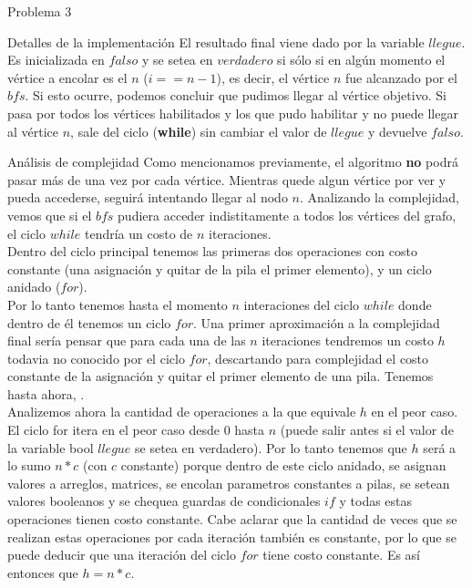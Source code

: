 \begin{section}{Problema 3}
\begin{subsection}{Detalles de la implementación}
		El resultado final viene dado por la variable $llegue$. Es inicializada en $falso$ y se setea en $verdadero$ si sólo si en algún momento el vértice a encolar es el $n$ ($i == n-1$), es decir, el vértice $n$ fue alcanzado por el $bfs$. Si esto ocurre, podemos concluir que pudimos llegar al vértice objetivo. Si pasa por todos los vértices habilitados y los que pudo habilitar y no puede llegar al vértice $n$, sale del ciclo (\textbf{while}) sin cambiar el valor de $llegue$ y devuelve $falso$.\\
		
	\end{subsection}


	\begin{subsection}{Análisis de complejidad}
		Como mencionamos previamente, el algoritmo \textbf{no} podrá pasar más de una vez por cada vértice. Mientras quede algun vértice por ver y pueda accederse, seguirá intentando llegar al nodo $n$. Analizando la complejidad, vemos que si el $bfs$ pudiera acceder indistitamente a todos los vértices del grafo, el ciclo $while$ tendría un costo de $n$ iteraciones.\\
		
		Dentro del ciclo principal tenemos las primeras dos operaciones con costo constante (una asignación y quitar de la pila el primer elemento), y un ciclo anidado ($for$).\\
		
		Por lo tanto tenemos hasta el momento $n$ interaciones del ciclo $while$ donde dentro de él tenemos un ciclo $for$. Una primer aproximación a la complejidad final sería pensar que para cada una de las $n$ iteraciones tendremos un costo $h$ todavia no conocido por el ciclo $for$, descartando para complejidad el costo constante de la asignación y quitar el primer elemento de una pila. Tenemos hasta ahora, .\\
		
		Analizemos ahora la cantidad de operaciones a la que equivale $h$ en el peor caso.\\
		
		El ciclo for itera en el peor caso desde $0$ hasta $n$ (puede salir antes si el valor de la variable bool $llegue$ se setea en verdadero). Por lo tanto tenemos que $h$ será a lo sumo $n*c$ (con $c$ constante) porque dentro de este ciclo anidado, se asignan valores a arreglos, matrices, se encolan parametros constantes a pilas, se setean valores booleanos y se chequea guardas de condicionales $if$ y todas estas operaciones tienen costo constante. Cabe aclarar que la cantidad de veces que se realizan estas operaciones por cada iteración también es constante, por lo que se puede deducir que una iteración del ciclo $for$ tiene costo constante. Es así entonces que $h = n*c$.\\
		

\end{subsection}
\end{section}

